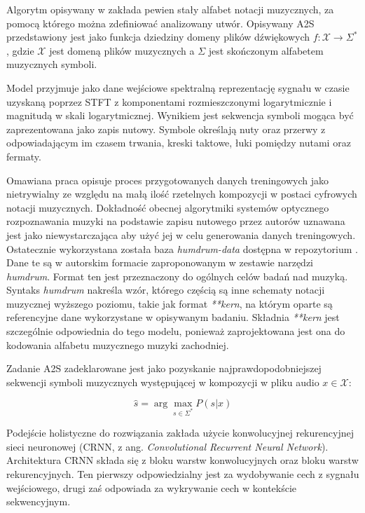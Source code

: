 \documentclass[12pt,a4paper,twoside]{mwart}
\begin{document}
Algorytm opisywany w \cite{Transcription:Pertus:NeuralNetwork} zakłada pewien stały alfabet notacji muzycznych, za pomocą którego można zdefiniować analizowany utwór. Opisywany A2S przedstawiony jest jako funkcja dziedziny domeny plików dźwiękowych $f : \mathcal{X} \rightarrow \Sigma^{\ast}$, gdzie $\mathcal{X}$ jest domeną plików muzycznych a $ \Sigma $ jest skończonym alfabetem muzycznych symboli.

Model przyjmuje jako dane wejściowe spektralną reprezentację sygnału w czasie uzyskaną poprzez STFT z komponentami rozmieszczonymi logarytmicznie i magnitudą w skali logarytmicznej. Wynikiem jest sekwencja symboli mogąca być zaprezentowana jako zapis nutowy. Symbole określają nuty oraz przerwy z odpowiadającym im czasem trwania, kreski taktowe, łuki pomiędzy nutami oraz fermaty.

Omawiana praca opisuje proces przygotowanych danych treningowych jako nietrywialny ze względu na małą ilość rzetelnych kompozycji w postaci cyfrowych notacji muzycznych. Dokładność obecnej algorytmiki systemów optycznego rozpoznawania muzyki na podstawie zapisu nutowego przez autorów uznawana jest jako niewystarczająca aby użyć jej w celu generowania danych treningowych. Ostatecznie wykorzystana została baza \textit{humdrum-data} dostępna w repozytorium \cite{Transcription:Sapp:Humdrum}. Dane te są w autorskim formacie zaproponowanym w zestawie narzędzi \textit{humdrum}. Format ten jest przeznaczony do ogólnych celów badań nad muzyką. Syntaks \textit{humdrum} nakreśla wzór, którego częścią są inne schematy notacji muzycznej wyższego poziomu, takie jak format \textit{**kern}, na którym oparte są referencyjne dane wykorzystane w opisywanym badaniu. Składnia \textit{**kern} jest szczególnie odpowiednia do tego modelu, ponieważ zaprojektowana jest ona do kodowania alfabetu muzycznego muzyki zachodniej.

Zadanie A2S zadeklarowane jest jako pozyskanie najprawdopodobniejszej sekwencji symboli muzycznych występującej w kompozycji w pliku audio $x \in \mathcal{X}$:

\begin{equation}
\widehat{s} = \arg \max_{s \in \Sigma^{\ast}} P (s | x)
\end{equation}

Podejście holistyczne do rozwiązania zakłada użycie konwolucyjnej rekurencyjnej sieci neuronowej (CRNN, z ang. \textit{Convolutional Recurrent Neural Network}). Architektura CRNN składa się z bloku warstw konwolucyjnych oraz bloku warstw rekurencyjnych. Ten pierwszy odpowiedzialny jest za wydobywanie cech z sygnału wejściowego, drugi zaś odpowiada za wykrywanie cech w kontekście sekwencyjnym. 
\end{document}
